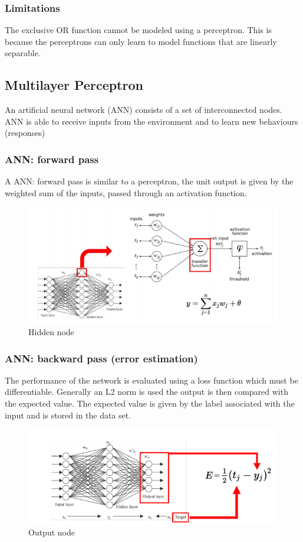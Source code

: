 \subsubsection{Limitations}
The exclusive OR function cannot be modeled using a perceptron. This is because the perceptrons can only learn to model functions that are linearly separable.
\subsection{Multilayer Perceptron}
An artificial neural network (ANN) consists of a set of interconnected nodes. ANN is able to receive inputs from the environment and to learn new behaviours (responses)
\subsubsection{ANN: forward pass} 
A ANN: forward pass is similar to a perceptron, the unit output is given by the weighted sum of the inputs, passed through an activation function. 
\begin{figure}[htbp]
    \centering
    \includegraphics[width= \textwidth]{Images/ANNFowardPass.PNG}
    \caption{Hidden node}
    \label{fig`:dendrogram}
\end{figure}
\smallskip
\subsubsection{ANN: backward pass (error estimation)}
The performance of the network is evaluated using a loss function which must be differentiable. Generally an L2 norm is used the output is then compared with the expected value. The expected value is given by the label associated with the input and is stored in the data set. 
\begin{figure}[!htbp]
    \centering
    \includegraphics[width= \textwidth]{Images/OutputLayer.PNG}
    \caption{Output node}
    \label{fig`:dendrogram}
\end{figure}
\smallskip
